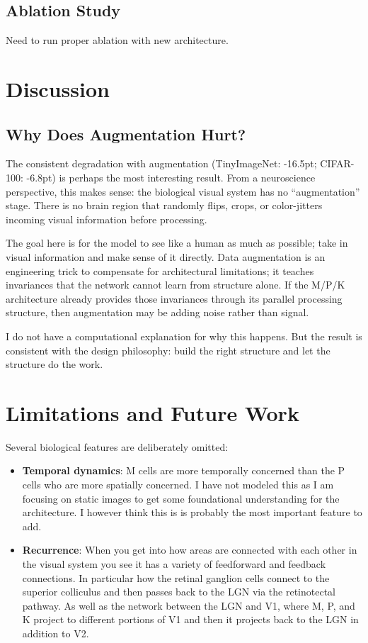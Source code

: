 \documentclass{article}
\begin{document}
\subsection{Ablation Study}

Need to run proper ablation with new architecture.

\section{Discussion}

\subsection{Why Does Augmentation Hurt?}

The consistent degradation with augmentation (TinyImageNet: -16.5pt; CIFAR-100: -6.8pt) is perhaps the most interesting result. From a neuroscience perspective, this makes sense: the biological visual system has no ``augmentation'' stage. There is no brain region that randomly flips, crops, or color-jitters incoming visual information before processing.

The goal here is for the model to see like a human as much as possible; take in visual information and make sense of it directly. Data augmentation is an engineering trick to compensate for architectural limitations; it teaches invariances that the network cannot learn from structure alone. If the M/P/K architecture already provides those invariances through its parallel processing structure, then augmentation may be adding noise rather than signal.

I do not have a computational explanation for why this happens. But the result is consistent with the design philosophy: build the right structure and let the structure do the work.

\section{Limitations and Future Work}

Several biological features are deliberately omitted:

\begin{itemize}
    \item \textbf{Temporal dynamics}: M cells are more temporally concerned than the P cells who are more spatially concerned. I have not modeled this as I am focusing on static images to get some foundational understanding for the architecture. I however think this is is probably the most important feature to add.
    \item \textbf{Recurrence}: When you get into how areas are connected with each other in the visual system you see it has a variety of feedforward and feedback connections. In particular how the retinal ganglion cells connect to the superior colliculus and then passes back to the LGN via the retinotectal pathway. As well as the network between the LGN and V1, where M, P, and K project to different portions of V1 and then it projects back to the LGN in addition to V2.
\end{itemize}
\end{document}
